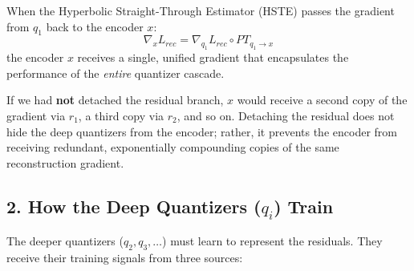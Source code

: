 \documentclass{article}
\begin{document}
When the Hyperbolic Straight-Through Estimator (HSTE) passes the gradient from $q_1$ back to the encoder $x$:
\begin{equation}
    \nabla_x L_{rec} = \nabla_{q_1} L_{rec} \circ PT_{q_1 \to x}
\end{equation}
the encoder $x$ receives a single, unified gradient that encapsulates the performance of the \textit{entire} quantizer cascade. 

If we had \textbf{not} detached the residual branch, $x$ would receive a second copy of the gradient via $r_1$, a third copy via $r_2$, and so on. Detaching the residual does not hide the deep quantizers from the encoder; rather, it prevents the encoder from receiving redundant, exponentially compounding copies of the same reconstruction gradient.

\subsection*{2. How the Deep Quantizers ($q_i$) Train}
The deeper quantizers ($q_2, q_3, \dots$) must learn to represent the residuals. They receive their training signals from three sources:
\end{document}
